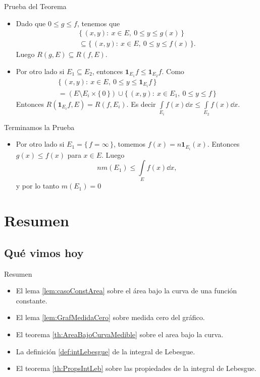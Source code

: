 \documentclass[utf8]{beamer}
\theoremstyle{plain}
\theoremstyle{definition}
\theoremstyle{remark}
\numberwithin{equation}{section}
\newcommand{\set}[1]{\{\,#1\,\}}    %
\newcommand{\x}{\times}
\renewcommand{\leq}{\leqslant}          %
\newcommand{\less}{\setminus}           %
\newcommand{\ind}{\mathbf{1}}       %
\renewcommand{\.}{\Cdot}                %
\begin{document}
\begin{frame}{Prueba del Teorema}
  \begin{itemize}
    \item Dado que $0\leq g\leq f$, tenemos que \begin{gather*}
      \set{(x,y):\ x\in E,\ 0\leq y\leq g(x)}\\
      \subseteq\set{(x,y):\ x\in E,\ 0\leq y\leq f(x)}.
    \end{gather*}
    Luego $R(g,E)\subseteq R(f,E)$.
    \item Por otro lado si $E_1\subseteq E_2$, entonces $\ind_{E_1}f\leq \ind_{E_2}f$. Como 
    \begin{gather*}
      \set{(x,y):\ x\in E,\ 0\leq y\leq \ind_{E_i}f}\\
      =(E\less E_i\x\set{0})\cup\set{(x,y):\ x\in E_1,\ 0\leq y\leq f}
    \end{gather*}
    Entonces $R(\ind_{E_i}f,E)=R(f,E_i)$. Es decir $\int\limits_{E_i}f(x)\dd x\leq \int\limits_{E_2}f(x)\dd x$.
  \end{itemize}
\end{frame}

\begin{frame}{Terminamos la Prueba}
  \begin{itemize}
    \item Por otro lado si $E_1=\set{f=\infty}$, tomemos $f(x)=n\ind_{E_i}(x)$. Entonces $g(x)\leq f(x)$ para $x\in E$. Luego 
    $$nm(E_1)\leq\int\limits_Ef(x)\dd x,$$
    y por lo tanto $m(E_1)=0$
  \end{itemize}
\end{frame}

\section*{Resumen}

\subsection*{Qu\'e vimos hoy}

\begin{frame}{Resumen}

  \begin{itemize}
  \item El lema \ref{lem:casoConstArea} sobre el área bajo la curva de una función constante.
  \item El lema \ref{lem:GrafMedidaCero} sobre medida cero del gráfico.
  \item El teorema \ref{th:AreaBajoCurvaMedible} sobre el area bajo la curva.
  \item La definición \ref{def:intLebesgue} de la integral de Lebesgue.
  \item El teorema \ref{th:PropsIntLeb} sobre las propiedades de la integral de Lebesgue.
  \end{itemize}
  
\end{frame}
\end{document}
